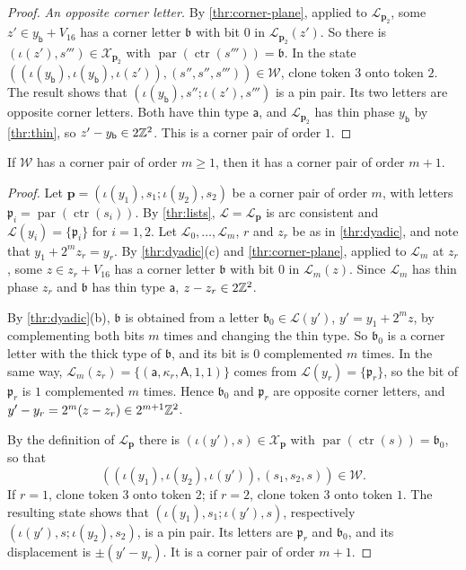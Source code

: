 \begin{proof}
\emph{An opposite corner letter.} By \cref{thr:corner-plane}, applied to $\mathcal L_{\mathbf p_2}$, some $z'\in y_{\mathsf b}+V_{16}$ has a corner letter $\mathfrak b$ with bit $0$ in $\mathcal L_{\mathbf p_2}(z')$. So there is $(\iota(z'),s''')\in\mathcal X_{\mathbf p_2}$ with $\operatorname{par}(\operatorname{ctr}(s'''))=\mathfrak b$. In the state $((\iota(y_{\mathsf b}),\iota(y_{\mathsf b}),\iota(z')),(s'',s'',s'''))\in\mathcal W$, clone token $3$ onto token $2$. The result shows that $(\iota(y_{\mathsf b}),s'';\iota(z'),s''')$ is a pin pair. Its two letters are opposite corner letters. Both have thin type $\mathsf a$, and $\mathcal L_{\mathbf p_2}$ has thin phase $y_{\mathsf b}$ by \cref{thr:thin}, so $z'-y_{\mathsf b}\in2\mathbb{Z}^2$. This is a corner pair of order $1$.
\end{proof}

\begin{lemma}[Promotion]\label{thr:promote}
If $\mathcal W$ has a corner pair of order $m\ge1$, then it has a corner pair of order $m+1$.
\end{lemma}

\begin{proof}
Let $\mathbf p=(\iota(y_1),s_1;\iota(y_2),s_2)$ be a corner pair of order $m$, with letters $\mathfrak p_i=\operatorname{par}(\operatorname{ctr}(s_i))$. By \cref{thr:lists}, $\mathcal L=\mathcal L_{\mathbf p}$ is arc consistent and $\mathcal L(y_i)=\{\mathfrak p_i\}$ for $i=1,2$. Let $\mathcal L_0,\dots,\mathcal L_m$, $r$ and $z_r$ be as in \cref{thr:dyadic}, and note that $y_1+2^mz_r=y_r$. By \cref{thr:dyadic}(c) and \cref{thr:corner-plane}, applied to $\mathcal L_m$ at $z_r$, some $z\in z_r+V_{16}$ has a corner letter $\mathfrak b$ with bit $0$ in $\mathcal L_m(z)$. Since $\mathcal L_m$ has thin phase $z_r$ and $\mathfrak b$ has thin type $\mathsf a$, $z-z_r\in2\mathbb{Z}^2$.

By \cref{thr:dyadic}(b), $\mathfrak b$ is obtained from a letter $\mathfrak b_0\in\mathcal L(y')$, $y'=y_1+2^mz$, by complementing both bits $m$ times and changing the thin type. So $\mathfrak b_0$ is a corner letter with the thick type of $\mathfrak b$, and its bit is $0$ complemented $m$ times. In the same way, $\mathcal L_m(z_r)=\{(\mathsf a,\kappa_r,\mathsf A,1,1)\}$ comes from $\mathcal L(y_r)=\{\mathfrak p_r\}$, so the bit of $\mathfrak p_r$ is $1$ complemented $m$ times. Hence $\mathfrak b_0$ and $\mathfrak p_r$ are opposite corner letters, and $y'-y_r=2^m(z-z_r)\in2^{m+1}\mathbb{Z}^2$.

By the definition of $\mathcal L_{\mathbf p}$ there is $(\iota(y'),s)\in\mathcal X_{\mathbf p}$ with $\operatorname{par}(\operatorname{ctr}(s))=\mathfrak b_0$, so that
\[
((\iota(y_1),\iota(y_2),\iota(y')),(s_1,s_2,s))\in\mathcal W.
\] If $r=1$, clone token $3$ onto token $2$; if $r=2$, clone token $3$ onto token $1$. The resulting state shows that $(\iota(y_1),s_1;\iota(y'),s)$, respectively $(\iota(y'),s;\iota(y_2),s_2)$, is a pin pair. Its letters are $\mathfrak p_r$ and $\mathfrak b_0$, and its displacement is $\pm(y'-y_r)$. It is a corner pair of order $m+1$.
\end{proof}

